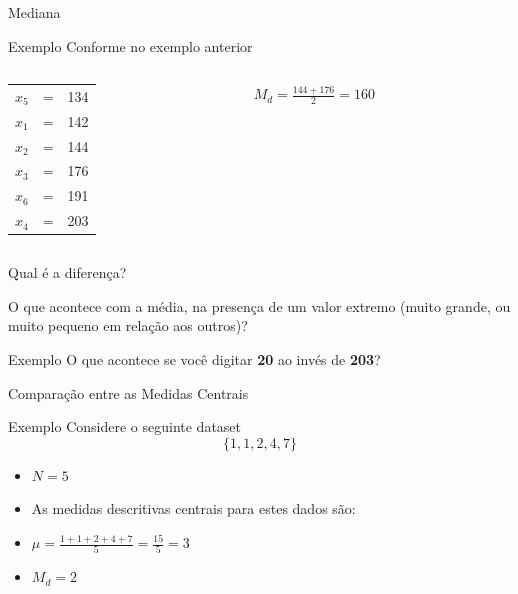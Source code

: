 \documentclass{beamer}
\begin{document}
\begin{frame}{Mediana}
  \begin{exampleblock}{Exemplo}
Conforme no exemplo anterior
    \begin{columns}
      \begin{column}{5cm}
        \begin{tabular}{ccc}
          $x_5$ &=&134\\
          $x_1$ &=&142\\
          $x_2$ &=&\alert{144}\\
          $x_3$ &=&\alert{176}\\
          $x_6$ &=&191\\
          $x_4$ &=&203\\
        \end{tabular}
      \end{column}
      \begin{column}{5cm}
        $M_d = \frac{144+176}{2}=160$
      \end{column}
    \end{columns}
  \end{exampleblock}
\end{frame}

\begin{frame}{Qual é a diferença?}
  \begin{block}{}
    O que acontece com a média, na presença de um valor extremo (muito grande, ou muito pequeno em relação aos outros)?
  \end{block}
  \begin{exampleblock}{Exemplo}
    O que acontece se você digitar {\bf 20} ao invés de {\bf 203}?
  \end{exampleblock}
\end{frame}

\begin{frame}{Comparação entre as Medidas Centrais}
  \begin{exampleblock}{Exemplo}
    Considere o seguinte dataset $$\{ 1,1,2,4,7\}$$
  \begin{itemize}
  \item $N=5$
  \item As medidas descritivas centrais para estes dados são:
  \item $\mu = \frac{1+1+2+4+7}{5} = \frac{15}{5}= 3$
  \item $M_d = 2$
  \end{itemize}
\end{exampleblock}
\end{frame}
\end{document}
